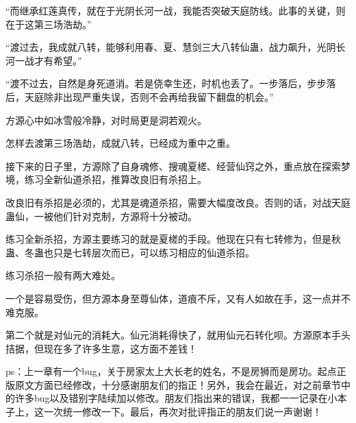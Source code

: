 \begin{this_body}
“而继承红莲真传，就在于光阴长河一战，我能否突破天庭防线。此事的关键，则在于这第三场浩劫。”

“渡过去，我成就八转，能够利用春、夏、慧剑三大八转仙蛊，战力飙升，光阴长河一战才有希望。”

“渡不过去，自然是身死道消。若是侥幸生还，时机也丢了。一步落后，步步落后，天庭除非出现严重失误，否则不会再给我留下翻盘的机会。”

方源心中如冰雪般冷静，对时局更是洞若观火。

怎样去渡第三场浩劫，成就八转，已经成为重中之重。

接下来的日子里，方源除了自身魂修、搜魂夏槎、经营仙窍之外，重点放在探索梦境，练习全新仙道杀招，推算改良旧有杀招上。

改良旧有杀招是必须的，尤其是魂道杀招，需要大幅度改良。否则的话，对战天庭蛊仙，一被他们针对克制，方源将十分被动。

练习全新杀招，方源主要练习的就是夏槎的手段。他现在只有七转修为，但是秋蛊、冬蛊也只是七转层次而已，可以练习相应的仙道杀招。

练习杀招一般有两大难处。

一个是容易受伤，但方源本身至尊仙体，道痕不斥，又有人如故在手，这一点并不难克服。

第二个就是对仙元的消耗大。仙元消耗得快了，就用仙元石转化呗。方源原本手头拮据，但现在多了许多生意，这方面不差钱！

ps：上一章有一个bug，关于房家太上大长老的姓名，不是房狮而是房功。起点正版原文方面已经修改，十分感谢朋友们的指正！另外，我会在最近，对之前章节中的许多bug以及错别字陆续加以修改。朋友们指出来的错误，我都一一记录在小本子上，这一次统一修改一下。最后，再次对批评指正的朋友们说一声谢谢！

\end{this_body}

